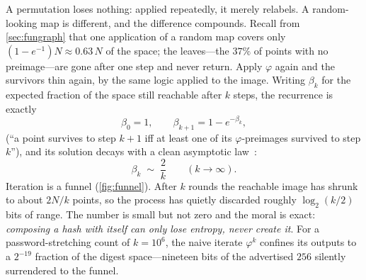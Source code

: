 A permutation loses nothing: applied repeatedly, it merely relabels. A
random-looking map is different, and the difference compounds. Recall
from \cref{sec:fungraph} that one application of a random map covers only
$(1-e^{-1})N \approx 0.63\,N$ of the space; the leaves---the $37\%$ of
points with no preimage---are gone after one step and never return.
Apply $\varphi$ again and the survivors thin again, by the same logic
applied to the image. Writing $\beta_{k}$ for the expected fraction of
the space still reachable after $k$ steps, the recurrence is exactly
\[
  \beta_{0} = 1, \qquad \beta_{k+1} = 1 - e^{-\beta_{k}},
\]
(``a point survives to step $k+1$ iff at least one of its
$\varphi$-preimages survived to step $k$''), and its solution decays
with a clean asymptotic law~\citep{FlajoletOdlyzko1990}:
\[
  \beta_{k} \;\sim\; \frac{2}{k} \qquad (k \to \infty).
\]
Iteration is a funnel (\cref{fig:funnel}). After $k$ rounds the reachable
image has shrunk to about $2N/k$ points, so the process has quietly
discarded roughly $\log_{2}(k/2)$ bits of range. The number is small but
not zero and the moral is exact: \emph{composing a hash with itself can
only lose entropy, never create it}. For a password-stretching count of
$k = 10^{6}$, the naive iterate $\varphi^{k}$ confines its outputs to a
$2^{-19}$ fraction of the digest space---nineteen bits of the advertised
$256$ silently surrendered to the funnel.


